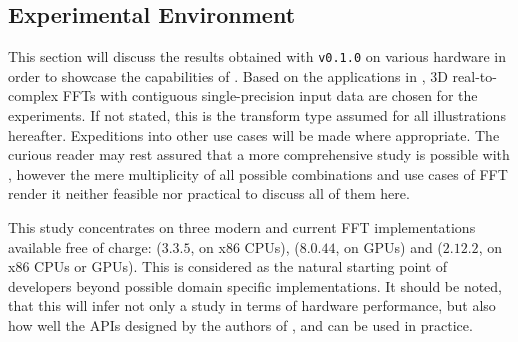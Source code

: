 \subsection{Experimental Environment}
\label{ssec:env}

This section will discuss the results obtained with \gearshifft{} \texttt{v0.1.0} on various hardware in order to showcase the capabilities of \gearshifft{}. Based on the applications in \cite{preibisch2014efficient, schmid2015real}, 3D real-to-complex FFTs with contiguous single-precision input data are chosen for the experiments. If not stated, this is the transform type assumed for all illustrations hereafter. 
%
Expeditions into other use cases will be made where appropriate. The curious reader may rest assured that a more comprehensive study is possible with \gearshifft{}, however the mere multiplicity of all possible combinations and use cases of FFT render it neither feasible nor practical to discuss all of them here.

This study concentrates on three modern and current FFT implementations available free of charge: \fftw{} ($3.3.5$, on x86 CPUs), \cufft{} ($8.0.44$, on \nvidia{} GPUs) and \clfft{} ($2.12.2$, on x86 CPUs or \nvidia{} GPUs). This is considered as the natural starting point of developers beyond possible domain specific implementations. It should be noted, that this will infer not only a study in terms of hardware performance, but also how well the APIs designed by the authors of \fftw{}, \clfft{} and \cufft{} can be used in practice. 

